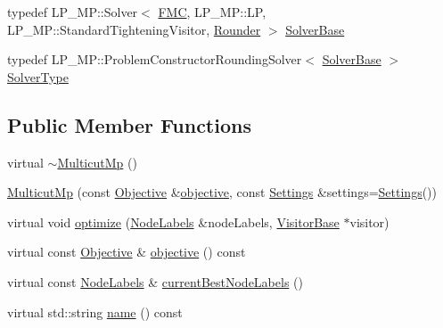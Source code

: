 \begin{DoxyCompactItemize}
\item 
typedef L\+P\+\_\+\+M\+P\+::\+Solver$<$ \hyperlink{classnifty_1_1graph_1_1MulticutMp_a89b39a5447859b773cda4ec6ca0eb7ec}{F\+M\+C}, L\+P\+\_\+\+M\+P\+::\+L\+P, L\+P\+\_\+\+M\+P\+::\+Standard\+Tightening\+Visitor, \hyperlink{classnifty_1_1graph_1_1MulticutMp_a475f0ecbf40dffd9cdad45867068edf4}{Rounder} $>$ \hyperlink{classnifty_1_1graph_1_1MulticutMp_ab1315bc5fb342e1b41934f2ccfade230}{Solver\+Base}
\item 
typedef L\+P\+\_\+\+M\+P\+::\+Problem\+Constructor\+Rounding\+Solver$<$ \hyperlink{classnifty_1_1graph_1_1MulticutMp_ab1315bc5fb342e1b41934f2ccfade230}{Solver\+Base} $>$ \hyperlink{classnifty_1_1graph_1_1MulticutMp_a0466925ff9888879fd24dcb67da4ff1b}{Solver\+Type}
\end{DoxyCompactItemize}
\subsection*{Public Member Functions}
\begin{DoxyCompactItemize}
\item 
virtual \hyperlink{classnifty_1_1graph_1_1MulticutMp_a2c60f3b8d53b9fbab093fa5874474ed7}{$\sim$\+Multicut\+Mp} ()
\item 
\hyperlink{classnifty_1_1graph_1_1MulticutMp_a0161246c44e9ecffe525c1ca137a0458}{Multicut\+Mp} (const \hyperlink{classnifty_1_1graph_1_1MulticutMp_a5dbc4d81a00cd2ad98b4d28bc64f8ea8}{Objective} \&\hyperlink{classnifty_1_1graph_1_1MulticutMp_a0fbedf2fb703a7f797f220c62d957dee}{objective}, const \hyperlink{structnifty_1_1graph_1_1MulticutMp_1_1Settings}{Settings} \&settings=\hyperlink{structnifty_1_1graph_1_1MulticutMp_1_1Settings}{Settings}())
\item 
virtual void \hyperlink{classnifty_1_1graph_1_1MulticutMp_a5d467673e5d93c57a58ad10ca7d69a59}{optimize} (\hyperlink{classnifty_1_1graph_1_1MulticutMp_ac6eb2553f7db7fd34c2c3a7c182c695d}{Node\+Labels} \&node\+Labels, \hyperlink{classnifty_1_1graph_1_1MulticutBase_a5882fb69df59d8113f6a81a0dac26eaa}{Visitor\+Base} $\ast$visitor)
\item 
virtual const \hyperlink{classnifty_1_1graph_1_1MulticutMp_a5dbc4d81a00cd2ad98b4d28bc64f8ea8}{Objective} \& \hyperlink{classnifty_1_1graph_1_1MulticutMp_a0fbedf2fb703a7f797f220c62d957dee}{objective} () const 
\item 
virtual const \hyperlink{classnifty_1_1graph_1_1MulticutMp_ac6eb2553f7db7fd34c2c3a7c182c695d}{Node\+Labels} \& \hyperlink{classnifty_1_1graph_1_1MulticutMp_ac5cd85fa1d445631b152eaa24a404d11}{current\+Best\+Node\+Labels} ()
\item 
virtual std\+::string \hyperlink{classnifty_1_1graph_1_1MulticutMp_acc6c49d26483a85b7dad35ba1958ac05}{name} () const 
\end{DoxyCompactItemize}


